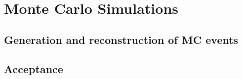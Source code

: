 \chapter{Monte Carlo Simulations}

\section{Generation and reconstruction of MC events}

\section{Acceptance}

